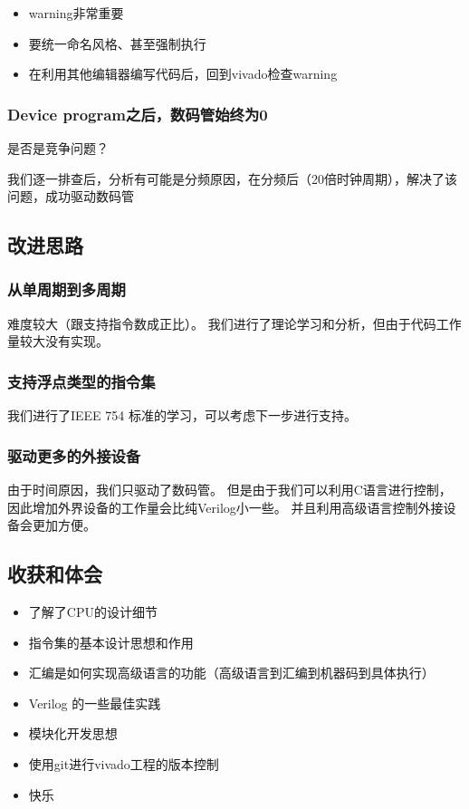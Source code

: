 \documentclass[UTF8]{article}
\begin{document}
\begin{itemize}
    \item warning非常重要
\item 要统一命名风格、甚至强制执行
\item 在利用其他编辑器编写代码后，回到vivado检查warning
  
\end{itemize}


\subsubsection{Device program之后，数码管始终为0}

是否是竞争问题？

我们逐一排查后，分析有可能是分频原因，在分频后（20倍时钟周期），解决了该问题，成功驱动数码管

\subsection{改进思路}
\subsubsection{从单周期到多周期}
  
难度较大（跟支持指令数成正比）。
我们进行了理论学习和分析，但由于代码工作量较大没有实现。
  
\subsubsection{支持浮点类型的指令集}
我们进行了IEEE 754 标准的学习，可以考虑下一步进行支持。
  
\subsubsection{驱动更多的外接设备}
由于时间原因，我们只驱动了数码管。
但是由于我们可以利用C语言进行控制，
因此增加外界设备的工作量会比纯Verilog小一些。
并且利用高级语言控制外接设备会更加方便。

\subsection{收获和体会}

\begin{itemize}
\item 了解了CPU的设计细节
\item 指令集的基本设计思想和作用
\item 汇编是如何实现高级语言的功能（高级语言到汇编到机器码到具体执行）
\item Verilog 的一些最佳实践
\item 模块化开发思想
\item 使用git进行vivado工程的版本控制
\item 快乐
\end{itemize}
\end{document}
